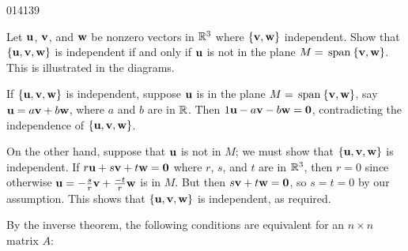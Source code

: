 \begin{example}{}{014139}
\begin{wrapfigure}[12]{l}{5cm} 
	\centering
	
\end{wrapfigure}

\setlength{\rightskip}{0pt plus 200pt}
Let $\textbf{u}$, $\textbf{v}$, and $\textbf{w}$ be nonzero vectors in $\mathbb{R}^3$ where $\{\textbf{v}, \textbf{w}\}$ independent. Show that $\{\textbf{u}, \textbf{v}, \textbf{w}\}$ is independent if and only if $\textbf{u}$ is not in the plane $M = \thinspace\operatorname{span\medspace}\{\textbf{v}, \textbf{w}\}$. This is illustrated in the diagrams.

\begin{solution}
If $\{\textbf{u}, \textbf{v}, \textbf{w}\}$ is independent, suppose $\textbf{u}$ is in the plane $M = \thinspace\operatorname{span\medspace}\{\textbf{v}, \textbf{w}\}$, say $\textbf{u} = a\textbf{v} + b\textbf{w}$, where $a$ and $b$ are in $\mathbb{R}$. Then $1\textbf{u} - a\textbf{v} - b\textbf{w} = \textbf{0}$, contradicting the independence of $\{\textbf{u}, \textbf{v}, \textbf{w}\}$.

On the other hand, suppose that $\textbf{u}$ is not in $M$; we must show that $\{\textbf{u}, \textbf{v}, \textbf{w}\}$ is independent. If $r\textbf{u} + s\textbf{v} + t\textbf{w} = \textbf{0}$ where $r$, $s$, and $t$ are in $\mathbb{R}^3$, then $r = 0$ since otherwise $\textbf{u} = -\tfrac{s}{r}\textbf{v} + \tfrac{-t}{r}\textbf{w}$ is in $M$. But then $s\textbf{v} + t\textbf{w} = \textbf{0}$, so $s = t = 0$ by our assumption. This shows that $\{\textbf{u}, \textbf{v}, \textbf{w}\}$ is independent, as required.
\end{solution}
\vspace{1em}
\end{example}

\noindent By the inverse theorem, the following conditions are equivalent for an $n \times n$ matrix $A$:

